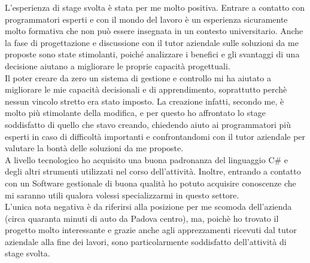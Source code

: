 L'esperienza di stage svolta è stata per me molto positiva. Entrare a contatto con programmatori esperti e con il mondo del lavoro è un esperienza sicuramente molto formativa che non può essere insegnata in un contesto universitario. Anche la fase di progettazione e discussione con il tutor aziendale sulle soluzioni da me proposte sono state stimolanti, poiché analizzare i benefici e gli svantaggi di una decisione aiutano a migliorare le proprie capacità progettuali.
\\Il poter creare da zero un sistema di gestione e controllo mi ha aiutato a migliorare le mie capacità decisionali e di apprendimento, soprattutto perchè nessun vincolo stretto era stato imposto. La creazione infatti, secondo me, è molto più stimolante della modifica, e per questo ho affrontato lo stage soddisfatto di quello che stavo creando, chiedendo aiuto ai programmatori più esperti in caso di difficoltà importanti e confrontandomi con il tutor aziendale per valutare la bontà delle soluzioni da me proposte.
\\A livello tecnologico ho acquisito una buona padronanza del linguaggio C\# e degli altri strumenti utilizzati nel corso dell'attività. Inoltre, entrando a contatto con un Software gestionale di buona qualità ho potuto acquisire conoscenze che mi saranno utili qualora volessi specializzarmi in questo settore.
\\L'unica nota negativa è da riferirsi alla posizione per me scomoda dell'azienda (circa quaranta minuti di auto da Padova centro), ma, poichè ho trovato il progetto molto interessante e grazie anche agli apprezzamenti ricevuti dal tutor aziendale alla fine dei lavori, sono particolarmente soddisfatto dell'attività di stage svolta.